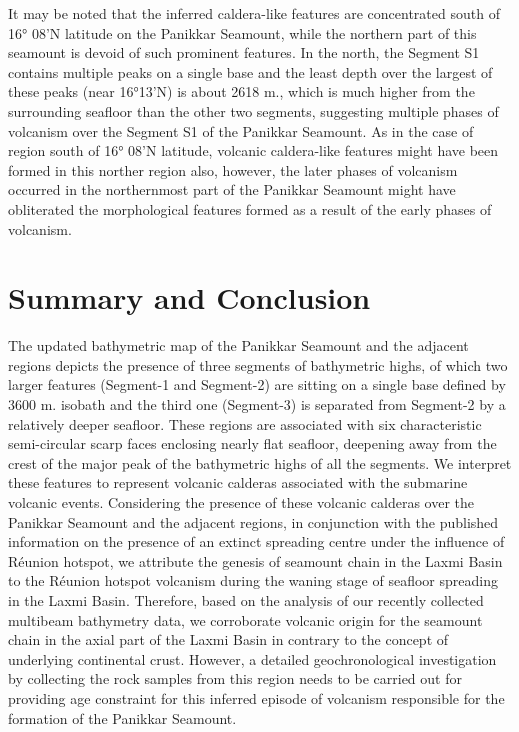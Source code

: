 \documentclass[twocolumn]{article}
\begin{document}
It may be noted that the inferred caldera-like features are concentrated south of 16° 08’N latitude on the Panikkar Seamount, while the northern part of this seamount is devoid of such prominent features. In the north, the Segment S1 contains multiple peaks on a single base and the least depth over the largest of these peaks (near 16°13'N) is about 2618 m., which is much higher from the surrounding seafloor than the other two segments, suggesting multiple phases of volcanism over the Segment S1 of the Panikkar Seamount. As in the case of region south of 16° 08’N latitude, volcanic caldera-like features might have been formed in this norther region also, however, the later phases of volcanism occurred in the northernmost part of the Panikkar Seamount might have obliterated the morphological features formed as a result of the early phases of volcanism.   

\section{Summary and Conclusion}

The updated bathymetric map of the Panikkar Seamount and the adjacent regions depicts the presence of three segments of bathymetric highs, of which two larger features (Segment-1 and Segment-2) are sitting on a single base defined by 3600 m. isobath and the third one (Segment-3) is separated from Segment-2 by a relatively deeper seafloor. These regions are associated with six characteristic semi-circular scarp faces enclosing nearly flat seafloor, deepening away from the crest of the major peak of the bathymetric highs of all the segments. We interpret these features to represent volcanic calderas associated with the submarine volcanic events. Considering the presence of these volcanic calderas over the Panikkar Seamount and the adjacent regions, in conjunction with the published information on the presence of an extinct spreading centre under the influence of R\'eunion hotspot, we attribute the genesis of seamount chain in the Laxmi Basin to the R\'eunion hotspot volcanism during the waning stage of seafloor spreading in the Laxmi Basin. Therefore, based on the analysis of our recently collected multibeam bathymetry data, we corroborate volcanic origin for the seamount chain in the axial part of the Laxmi Basin in contrary to the concept of underlying continental crust. However, a detailed geochronological investigation by collecting the rock samples from this region needs to be carried out for providing age constraint for this inferred episode of volcanism responsible for the formation of the Panikkar Seamount.
\end{document}
